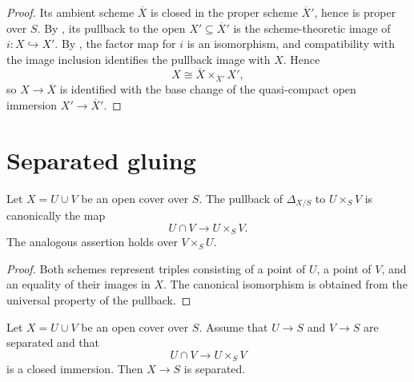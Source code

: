 \begin{proof}
  \leanok
  Its ambient scheme $\overline X$ is closed in the proper scheme
  $\overline X'$, hence is proper over $S$.  By
  , its pullback to the open
  $X'\subseteq\overline X'$ is the scheme-theoretic image of
  $i\colon X\hookrightarrow X'$.  By
  , the factor map for
  $i$ is an isomorphism, and compatibility with the image inclusion identifies
  the pullback image with $X$.  Hence
  \[
    X\cong\overline X\times_{\overline X'}X',
  \]
  so $X\to\overline X$ is identified with the base change of the
  quasi-compact open immersion $X'\to\overline X'$.
\end{proof}

\section{Separated gluing}

\begin{lemma}
  \label{lemma:nagata-diagonal-mixed-open}
  \leanok

  Let $X=U\cup V$ be an open cover over $S$.  The pullback of
  $\Delta_{X/S}$ to $U\times_SV$ is canonically the map
  \[
    U\cap V\longrightarrow U\times_SV.
  \]
  The analogous assertion holds over $V\times_SU$.
\end{lemma}

\begin{proof}
  \leanok
  Both schemes represent triples consisting of a point of $U$, a point of
  $V$, and an equality of their images in $X$.  The canonical isomorphism is
  obtained from the universal property of the pullback.
\end{proof}

\begin{lemma}
  \label{lemma:nagata-separated-two-open-cover}
  \leanok

  Let $X=U\cup V$ be an open cover over $S$.  Assume that $U\to S$ and
  $V\to S$ are separated and that
  \[
    U\cap V\longrightarrow U\times_SV
  \]
  is a closed immersion.  Then $X\to S$ is separated.
\end{lemma}

